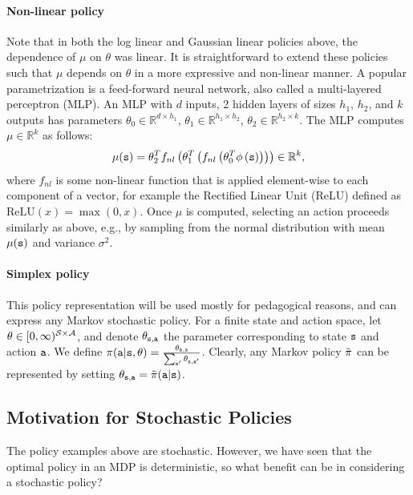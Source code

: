 \paragraph{Non-linear policy} Note that in both the log linear and Gaussian linear policies above, the dependence of $\mu$ on $\theta$ was linear. It is straightforward to extend these policies such that $\mu$ depends on $\theta$ in a more expressive and non-linear manner. A popular parametrization is a feed-forward neural network, also called a multi-layered perceptron (MLP). An MLP with $d$ inputs, 2 hidden layers of sizes $h_1$, $h_2$, and $k$ outputs has parameters $\theta_0 \in \mathbb{R}^{d \times h_1}$, $\theta_1 \in \mathbb{R}^{h_1 \times h_2}$, $\theta_2 \in \mathbb{R}^{h_2 \times k}$. The MLP computes $\mu\in \mathbb{R}^{k}$ as follows:
\begin{equation*}
    \mu({\tt s}) = \theta_2^T f_{nl}\left(\theta_1^T\left( f_{nl}\left(\theta_0^T \phi\left({\tt s} \right)\right)\right)\right) \in \mathbb{R}^{k},
\end{equation*}
where $f_{nl}$ is some non-linear function that is applied element-wise to each component of a vector, for example the Rectified Linear Unit (ReLU) defined as $\text{ReLU}(x) = \max(0, x)$. Once $\mu$ is computed, selecting an
action proceeds similarly as above, e.g., by sampling from the normal distribution with mean
$\mu({\tt s})$ and variance $\sigma^2$.

\paragraph{Simplex policy} This policy representation will be used mostly for pedagogical reasons, and can express any Markov stochastic policy. For a finite state and action space, let $\theta \in [0,\infty)^{\mathcal{S} \times \mathcal{A}}$, and denote $\theta_{{\tt s},{\tt a}}$ the parameter corresponding to state ${\tt s}$ and action ${\tt a}$. We define $\pi({\tt a}|{\tt s},\theta) = \frac{\theta_{{\tt s},{\tt a}}}{\sum_{{\tt a}'} \theta_{{\tt s},{\tt a}'}}$. Clearly, any Markov policy $\tilde{\pi}$ can be represented by setting $\theta_{{\tt s},{\tt a}} = \tilde{\pi}({\tt a}|{\tt s})$.

\subsection{Motivation for Stochastic Policies}
The policy examples above are stochastic. However, we have seen that the optimal policy in an MDP is deterministic, so
what benefit can be in considering a stochastic policy?


